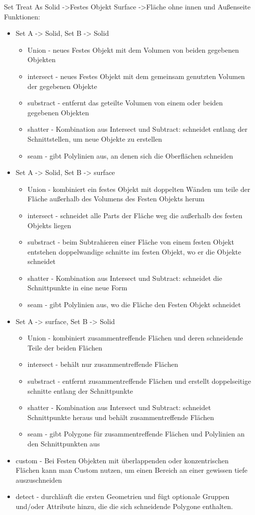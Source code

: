 Set	Treat As	Solid	->Festes Objekt
			Surface ->Fläche ohne innen und Außenseite
Funktionen:
\begin{itemize}
\item Set A -> Solid, Set B -> Solid
	\begin{itemize}
	\item Union - neues Festes Objekt mit dem Volumen von beiden gegebenen Objekten
	\item intersect - neues Festes Objekt mit dem gemeinsam genutzten Volumen der gegebenen Objekte
	\item substract - entfernt das geteilte Volumen von einem oder beiden gegebenen Objekten
	\item shatter - Kombination aus Intersect und Subtract: schneidet entlang der Schnittstellen, um neue Objekte zu erstellen
	\item seam - gibt Polylinien aus, an denen sich die Oberflächen schneiden
	\end{itemize}

\item Set A -> Solid, Set B -> surface
	\begin{itemize}
	\item Union - kombiniert ein festes Objekt mit doppelten Wänden um teile der Fläche außerhalb des Volumens des Festen Objekts herum
	\item intersect - schneidet alle Parts der Fläche weg die außerhalb des festen Objekts liegen
	\item substract - beim Subtrahieren einer Fläche von einem festen Objekt entstehen doppelwandige schnitte im festen Objekt, wo er die Objekte schneidet
	\item shatter - Kombination aus Intersect und Subtract: schneidet die Schnittpunkte in eine neue Form
	\item seam - gibt Polylinien aus, wo die Fläche den Festen Objekt schneidet
	\end{itemize}
\item Set A -> surface, Set B -> Solid
	\begin{itemize}
	\item Union - kombiniert zusammentreffende Flächen und deren schneidende Teile der beiden Flächen
	\item intersect - behält nur zusammentreffende Flächen
	\item substract - entfernt zusammentreffende Flächen und erstellt doppelseitige schnitte entlang der Schnittpunkte
	\item shatter - Kombination aus Intersect und Subtract:  schneidet Schnittpunkte heraus und behält zusammentreffende Flächen 
	\item seam - gibt Polygone für zusammentreffende Flächen und Polylinien an den Schnittpunkten aus 
	\end{itemize}
\item custom	- Bei Festen Objekten mit überlappenden oder konzentrischen Flächen kann man Custom nutzen, um einen Bereich an einer gewissen tiefe auszuschneiden
\item detect	- durchläuft die ersten Geometrien und fügt optionale Gruppen und/oder Attribute hinzu, die die sich schneidende Polygone enthalten.
\end{itemize}

